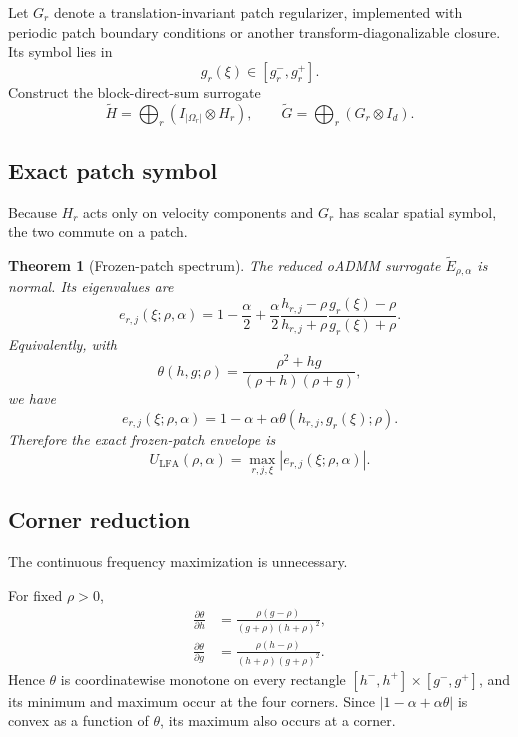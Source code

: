 \documentclass[pdflatex,iicol,sn-mathphys-num]{sn-jnl}
\newtheorem{theorem}{Theorem}[section]
\theoremstyle{definition}\newtheorem{definition}[theorem]{Definition}\newtheorem{remark}[theorem]{Remark}
\begin{document}
Let $G_r$ denote a translation-invariant patch regularizer, implemented with periodic patch boundary conditions or another transform-diagonalizable closure. Its symbol lies in
\[
g_r(\xi)\in[g_r^-,g_r^+].
\]
Construct the block-direct-sum surrogate
\[
\widetilde H=\bigoplus_r(I_{|\Omega_r|}\otimes H_r),
\qquad
\widetilde G=\bigoplus_r(G_r\otimes I_d).
\]

\subsection{Exact patch symbol}
Because $H_r$ acts only on velocity components and $G_r$ has scalar spatial symbol, the two commute on a patch.

\begin{theorem}[Frozen-patch spectrum]\label{thm:frozen}
The reduced oADMM surrogate $\widetilde E_{\rho,\alpha}$ is normal. Its eigenvalues are
\begin{equation}
e_{r,j}(\xi;\rho,\alpha)
=1-\frac{\alpha}{2}
+\frac{\alpha}{2}
\frac{h_{r,j}-\rho}{h_{r,j}+\rho}
\frac{g_r(\xi)-\rho}{g_r(\xi)+\rho}.
\label{eq:local_eig}
\end{equation}
Equivalently, with
\begin{equation}
\theta(h,g;\rho)=\frac{\rho^2+hg}{(\rho+h)(\rho+g)},
\label{eq:theta}
\end{equation}
we have
\[
e_{r,j}(\xi;\rho,\alpha)
=1-\alpha+\alpha\theta(h_{r,j},g_r(\xi);\rho).
\]
Therefore the exact frozen-patch envelope is
\begin{equation}
U_{\mathrm{LFA}}(\rho,\alpha)
=\max_{r,j,\xi}|e_{r,j}(\xi;\rho,\alpha)|.
\label{eq:ULFA}
\end{equation}
\end{theorem}

\subsection{Corner reduction}
The continuous frequency maximization is unnecessary.

\begin{lemma}\label{lem:corners}
For fixed $\rho>0$,
\begin{align}
\frac{\partial\theta}{\partial h}
&=\frac{\rho(g-\rho)}{(g+\rho)(h+\rho)^2},\\
\frac{\partial\theta}{\partial g}
&=\frac{\rho(h-\rho)}{(h+\rho)(g+\rho)^2}.
\end{align}
Hence $\theta$ is coordinatewise monotone on every rectangle
$[h^-,h^+]\times[g^-,g^+]$, and its minimum and maximum occur at the four corners. Since $|1-\alpha+\alpha\theta|$ is convex as a function of $\theta$, its maximum also occurs at a corner.
\end{lemma}
\end{document}
